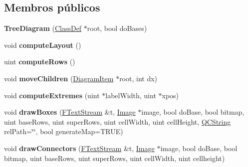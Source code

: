 \subsection*{Membros públicos}
\begin{DoxyCompactItemize}
\item 
\hypertarget{class_tree_diagram_a0631c1c4836c3c25f88b9d5734014cad}{{\bfseries Tree\-Diagram} (\hyperlink{class_class_def}{Class\-Def} $\ast$root, bool do\-Bases)}\label{class_tree_diagram_a0631c1c4836c3c25f88b9d5734014cad}

\item 
\hypertarget{class_tree_diagram_aa2ccf6c384ae28cf3dee4426b5a8797e}{void {\bfseries compute\-Layout} ()}\label{class_tree_diagram_aa2ccf6c384ae28cf3dee4426b5a8797e}

\item 
\hypertarget{class_tree_diagram_a783f81a5cd46e4759eaba6b00fc0efe5}{uint {\bfseries compute\-Rows} ()}\label{class_tree_diagram_a783f81a5cd46e4759eaba6b00fc0efe5}

\item 
\hypertarget{class_tree_diagram_a6c9bf97a60ef3fc48f7ad6e1cebf7408}{void {\bfseries move\-Children} (\hyperlink{class_diagram_item}{Diagram\-Item} $\ast$root, int dx)}\label{class_tree_diagram_a6c9bf97a60ef3fc48f7ad6e1cebf7408}

\item 
\hypertarget{class_tree_diagram_a17bbf280f9fa97793c785b71fa2749fe}{void {\bfseries compute\-Extremes} (uint $\ast$label\-Width, uint $\ast$xpos)}\label{class_tree_diagram_a17bbf280f9fa97793c785b71fa2749fe}

\item 
\hypertarget{class_tree_diagram_a69f4bcf0cc47e56e8df96cb9d1897cf5}{void {\bfseries draw\-Boxes} (\hyperlink{class_f_text_stream}{F\-Text\-Stream} \&t, \hyperlink{class_image}{Image} $\ast$image, bool do\-Base, bool bitmap, uint base\-Rows, uint super\-Rows, uint cell\-Width, uint cell\-Height, \hyperlink{class_q_c_string}{Q\-C\-String} rel\-Path=\char`\"{}\char`\"{}, bool generate\-Map=T\-R\-U\-E)}\label{class_tree_diagram_a69f4bcf0cc47e56e8df96cb9d1897cf5}

\item 
\hypertarget{class_tree_diagram_aff591fe6679c8f82b60b492e49c26f10}{void {\bfseries draw\-Connectors} (\hyperlink{class_f_text_stream}{F\-Text\-Stream} \&t, \hyperlink{class_image}{Image} $\ast$image, bool do\-Base, bool bitmap, uint base\-Rows, uint super\-Rows, uint cell\-Width, uint cellheight)}\label{class_tree_diagram_aff591fe6679c8f82b60b492e49c26f10}

\end{DoxyCompactItemize}
